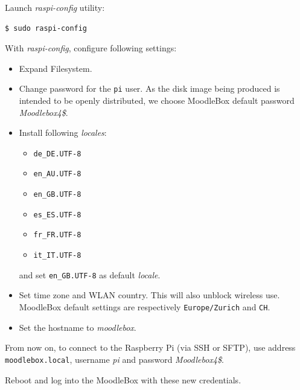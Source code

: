 \documentclass[12pt]{article}
\begin{document}
Launch \emph{raspi-config} utility:
\begin{lstlisting}[language=bash]
$ sudo raspi-config
\end{lstlisting}

With \emph{raspi-config}, configure following settings:
\begin{itemize}
\item Expand Filesystem.
\item Change password for the \lstinline{pi} user.
As the disk image being produced is intended to be openly distributed, we choose MoodleBox default password \emph{Moodlebox4\$}.
\item Install following \emph{locales}:
\begin{itemize}
\item \lstinline{de_DE.UTF-8}
\item \lstinline{en_AU.UTF-8}
\item \lstinline{en_GB.UTF-8}
\item \lstinline{es_ES.UTF-8}
\item \lstinline{fr_FR.UTF-8}
\item \lstinline{it_IT.UTF-8}
\end{itemize}
and set \lstinline{en_GB.UTF-8} as default \emph{locale}.
\item Set time zone and WLAN country.
This will also unblock wireless use.
MoodleBox default settings are respectively \lstinline{Europe/Zurich} and \lstinline{CH}.
\item Set the hostname to \emph{moodlebox}.
\end{itemize}

From now on, to connect to the Raspberry Pi (via SSH or SFTP), use address \lstinline{moodlebox.local}, username \emph{pi} and password \emph{Moodlebox4\$}.

Reboot and log into the MoodleBox with these new credentials.

\end{document}
